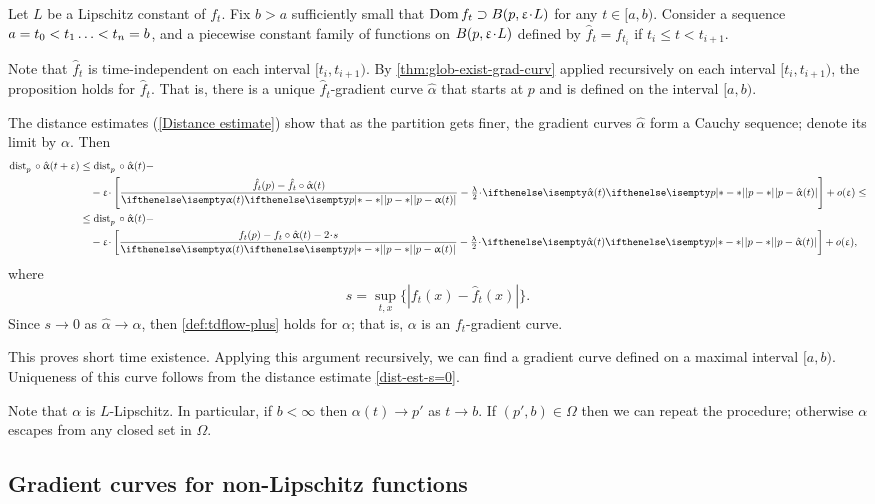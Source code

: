 Let $L$ be a Lipschitz constant of $f_t$.
Fix $b>a$ sufficiently small  that $\Dom f_t\supset B(p,\eps\cdot L)$ for any $t\in[a,b)$.
Consider a sequence  $a=t_0<t_1\dots<t_n\z=b$, and a piecewise constant family of functions on $B(p,\eps\cdot L)$ defined by $\hat f_t=f_{t_i}$ if $t_i\le t<t_{i+1}$.

Note that $\hat f_t$ is time-independent on each interval $[t_i,t_{i+1})$.
By  \ref{thm:glob-exist-grad-curv} applied recursively on each interval $[t_i,t_{i+1})$,  the proposition holds for $\hat f_t$.
That is, there is a unique $\hat f_t$-gradient curve $\hat \alpha$ that starts at $p$ and is defined on the interval $[a,b)$.

The distance estimates (\ref{Distance estimate}) show that as the partition gets finer, the gradient curves $\hat\alpha$ form a Cauchy sequence; denote its limit by $\alpha$.
Then
\begin{align*}
\distfun{p}{}{}\circ\hat\alpha(t+\eps)
&\le 
\distfun{p}{}{}\circ\hat\alpha(t)-
\\
&\quad
-\eps\cdot \left[\frac{\hat f_t(p)-\hat f_t\circ\hat\alpha(t)}{\dist{p}{\alpha(t)}{}}-\tfrac\lambda2\cdot \dist{p}{\hat\alpha(t)}{}\right] 
+o(\eps)\le
\\
&\le 
\distfun{p}{}{}\circ\hat\alpha(t)-
\\
&\quad
-\eps\cdot \left[\frac{f_t(p)-f_t\circ\hat\alpha(t)-2\cdot s}{\dist{p}{\alpha(t)}{}}-\tfrac\lambda2\cdot \dist{p}{\hat\alpha(t)}{}\right]
+o(\eps),
\end{align*}
where 
\[s=\sup_{t,x} \{|f_t(x)-\hat f_t(x)|\}.\]
Since $s\to 0$ as $\hat\alpha\to \alpha$, then \ref{def:tdflow-plus} holds for $\alpha$;
that is, $\alpha$ is an $f_t$-gradient curve.

This proves short time existence.
Applying this argument recursively, we can find a gradient curve defined on a maximal interval $[a,b)$.
Uniqueness of this curve follows from the distance estimate \ref{dist-est-s=0}. 

Note that $\alpha$ is $L$-Lipschitz.
In particular, if $b<\infty$ then $\alpha(t)\to p'$ as $t\to b$.
If $(p',b)\in \Omega$ then we can repeat the procedure; otherwise $\alpha$ escapes from any closed set in $\Omega$. 
\qeds

\subsection*{Gradient curves for non-Lipschitz functions}\label{sec:non-lip}

